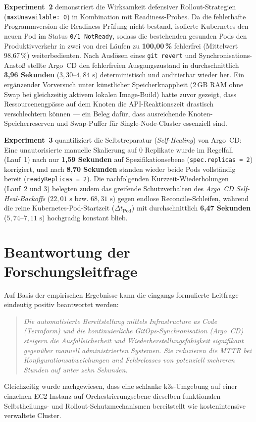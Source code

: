 \textbf{Experiment~2} demonstriert die Wirksamkeit defensiver Rollout-Strategien (\texttt{maxUnavailable: 0}) in Kombination mit Readiness-Probes. Da die fehlerhafte Programmversion die Readiness-Prüfung nicht bestand, isolierte Kubernetes den neuen Pod im Status \texttt{0/1 NotReady}, sodass die bestehenden gesunden Pods den Produktivverkehr in zwei von drei Läufen zu \textbf{100,00\,\%} fehlerfrei (Mittelwert 98{,}67\,\%) weiterbedienten. Nach Auslösen eines \texttt{git revert} und Synchronisations-Anstoß stellte Argo~CD den fehlerfreien Ausgangszustand in durchschnittlich \textbf{3,96 Sekunden} ($3{,}30\text{--}4{,}84\text{ s}$) deterministisch und auditierbar wieder her. Ein ergänzender Vorversuch unter künstlicher Speicherknappheit (2\,GB RAM ohne Swap bei gleichzeitig aktivem lokalen Image-Build) hatte zuvor gezeigt, dass Ressourcenengpässe auf dem Knoten die API-Reaktionszeit drastisch verschlechtern können — ein Beleg dafür, dass ausreichende Knoten-Speicherreserven und Swap-Puffer für Single-Node-Cluster essenziell sind.

\textbf{Experiment~3} quantifiziert die Selbstreparatur (\textit{Self-Healing}) von Argo~CD: Eine unautorisierte manuelle Skalierung auf 0 Replikate wurde im Regelfall (Lauf~1) nach nur \textbf{1,59 Sekunden} auf Spezifikationsebene (\texttt{spec.replicas = 2}) korrigiert, und nach \textbf{8,70 Sekunden} standen wieder beide Pods vollständig bereit (\texttt{readyReplicas = 2}). Die nachfolgenden Kurzzeit-Wiederholungen (Lauf~2 und 3) belegten zudem das greifende Schutzverhalten des \textit{Argo~CD Self-Heal-Backoffs} ($22{,}01\text{ s}$ bzw. $68{,}31\text{ s}$) gegen endlose Reconcile-Schleifen, während die reine Kubernetes-Pod-Startzeit ($\Delta t_{\text{Pod}}$) mit durchschnittlich \textbf{6,47 Sekunden} ($5{,}74\text{--}7{,}11\text{ s}$) hochgradig konstant blieb.

\section{Beantwortung der Forschungsleitfrage}
\label{sec:beantwortung-leitfrage}
Auf Basis der empirischen Ergebnisse kann die eingangs formulierte Leitfrage eindeutig positiv beantwortet werden:
\begin{quote}
\textit{Die automatisierte Bereitstellung mittels Infrastructure as Code (Terraform) und die kontinuierliche GitOps-Synchronisation (Argo~CD) steigern die Ausfallsicherheit und Wiederherstellungsfähigkeit signifikant gegenüber manuell administrierten Systemen. Sie reduzieren die MTTR bei Konfigurationsabweichungen und Fehlreleases von potenziell mehreren Stunden auf unter zehn Sekunden.}
\end{quote}
Gleichzeitig wurde nachgewiesen, dass eine schlanke k3s-Umgebung auf einer einzelnen EC2-Instanz auf Orchestrierungsebene dieselben funktionalen Selbstheilungs- und Rollout-Schutzmechanismen bereitstellt wie kostenintensive verwaltete Cluster.

